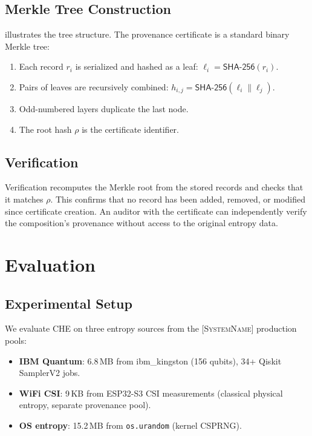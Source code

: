 \documentclass[sigconf,anonymous,review]{acmart}
\theoremstyle{acmdefinition}%
\theoremstyle{acmplain}%
\newcommand{\sysname}{\textsc{[SystemName]}\xspace}
\newcommand{\che}{\textsc{CHE}\xspace}
\begin{document}
\subsection{Merkle Tree Construction}
\label{sec:provenance:merkle}

 illustrates the tree structure.
The provenance certificate is a standard binary Merkle tree:
\begin{enumerate}
  \item Each record $r_i$ is serialized and hashed as a leaf:
        $\ell_i = \mathsf{SHA\text{-}256}(r_i)$.
  \item Pairs of leaves are recursively combined:
        $h_{i,j} = \mathsf{SHA\text{-}256}(\ell_i \| \ell_j)$.
  \item Odd-numbered layers duplicate the last node.
  \item The root hash $\rho$ is the certificate identifier.
\end{enumerate}

\subsection{Verification}
\label{sec:provenance:verification}

Verification recomputes the Merkle root from the stored records and
checks that it matches $\rho$.
%
This confirms that no record has been added, removed, or modified
since certificate creation.
%
An auditor with the certificate can independently verify the
composition's provenance without access to the original entropy data.


\section{Evaluation}
\label{sec:evaluation}

\subsection{Experimental Setup}
\label{sec:eval:setup}

We evaluate \che on three entropy sources from the \sysname
production pools:
\begin{itemize}
  \item \textbf{IBM Quantum}: 6.8\,MB from ibm\_kingston (156
        qubits), 34+ Qiskit SamplerV2 jobs.
  \item \textbf{WiFi CSI}: 9\,KB from ESP32-S3 CSI measurements
        (classical physical entropy,
        separate provenance pool).
  \item \textbf{OS entropy}: 15.2\,MB from \texttt{os.urandom}
        (kernel CSPRNG).
\end{itemize}
\end{document}

